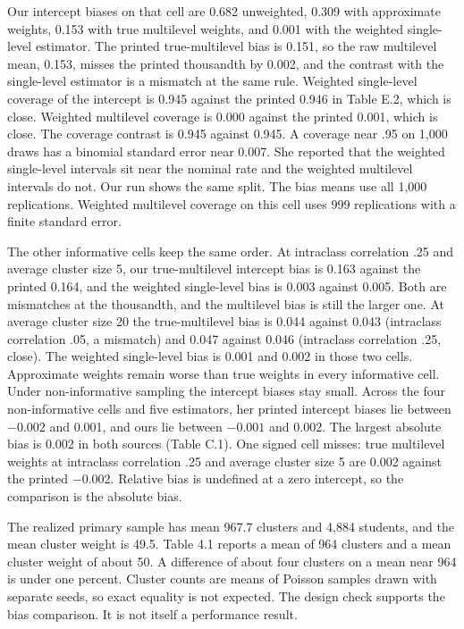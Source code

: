Our intercept biases on that cell are 0.682 unweighted, 0.309 with
approximate weights, 0.153 with true multilevel weights, and 0.001 with the
weighted single-level estimator.
The printed true-multilevel bias is 0.151, so the raw multilevel mean, 0.153,
misses the printed thousandth by 0.002, and the contrast with the
single-level estimator is a mismatch at the same rule.
Weighted single-level coverage of the intercept is 0.945 against the printed
0.946 in Table E.2, which is close.
Weighted multilevel coverage is 0.000 against the printed 0.001, which is close.
The coverage contrast is 0.945 against 0.945.
A coverage near .95 on 1,000 draws has a binomial standard error near 0.007.
She reported that the weighted single-level intervals sit near the nominal
rate and the weighted multilevel intervals do not.
Our run shows the same split.
The bias means use all 1,000 replications.
Weighted multilevel coverage on this cell uses 999 replications with a finite
standard error.

The other informative cells keep the same order.
At intraclass correlation .25 and average cluster size 5, our true-multilevel
intercept bias is 0.163 against the printed 0.164, and the weighted
single-level bias is 0.003 against 0.005.
Both are mismatches at the thousandth, and the multilevel bias is still the
larger one.
At average cluster size 20 the true-multilevel bias is 0.044 against 0.043
(intraclass correlation .05, a mismatch) and 0.047 against 0.046
(intraclass correlation .25, close).
The weighted single-level bias is 0.001 and 0.002 in those two cells.
Approximate weights remain worse than true weights in every informative cell.
Under non-informative sampling the intercept biases stay small.
Across the four non-informative cells and five estimators, her printed
intercept biases lie between $-0.002$ and 0.001, and ours lie between
$-0.001$ and 0.002.
The largest absolute bias is 0.002 in both sources (Table C.1).
One signed cell misses: true multilevel weights at intraclass correlation .25
and average cluster size 5 are 0.002 against the printed $-0.002$.
Relative bias is undefined at a zero intercept, so the comparison is the
absolute bias.

The realized primary sample has mean 967.7 clusters and 4,884 students, and
the mean cluster weight is 49.5.
Table 4.1 reports a mean of 964 clusters and a mean cluster weight of about
50.
A difference of about four clusters on a mean near 964 is under one percent.
Cluster counts are means of Poisson samples drawn with separate seeds, so
exact equality is not expected.
The design check supports the bias comparison.
It is not itself a performance result.

